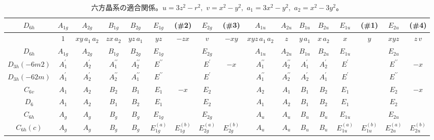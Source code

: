 \documentclass[11pt]{easymemo}
\begin{document}
\begin{landscape}
\begin{table}[ht!]
\scriptsize
\begin{center}
\caption{六方晶系の適合関係。$u=3z^2-r^2,\,\, v=x^2-y^2,\,\, a_1=3x^2-y^2,\,\, a_2=x^2-3y^2$。}
\label{tbl:9}
\renewcommand{\arraystretch}{1.4}
\begin{tabular}{c||c|c|c|c|cc|cc||c|c|c|c|cc|cc} \hline\hline
$ D_{6h} $ & $ A_{1g} $ & $ A_{2g} $ & $ B_{1g} $ & $ B_{2g} $ & $ E_{1g} $ & (\#2) & $ E_{2g} $ & (\#3) & $ A_{1u} $ & $ A_{2u} $ & $ B_{1u} $ & $ B_{2u} $ & $ E_{1u} $ & (\#1) & $ E_{2u} $ & (\#4) \\ \hline\hline
$  $ & $ 1 $ & $ xy\,a_1\,a_2 $ & $ zx\,a_2 $ & $ yz\,a_1 $ & $ yz $ & $ -zx $ & $ v $ & $ -xy $ & $ xyz\,a_1\,a_2 $ & $ z $ & $ y\,a_1 $ & $ x\,a_2 $ & $ x $ & $ y $ & $ xyz $ & $ z\,v $ \\ \hline\hline
$ D_{6h} $ & $ A_{1g} $ & $ A_{2g} $ & $ B_{1g} $ & $ B_{2g} $ & $ E_{1g} $ & & $ E_{2g} $ & & $ A_{1u} $ & $ A_{2u} $ & $ B_{1u} $ & $ B_{2u} $ & $ E_{1u} $ & & $ E_{2u} $ & \\ \hline
$ D_{3h}(-6m2) $ & $ A_{1}^{\prime} $ & $ A_{2}^{\prime} $ & $ A_{1}^{\prime\prime} $ & $ A_{2}^{\prime\prime} $ & $ E^{\prime\prime} $ & & $ E^{\prime} $ & $ -x $ & $ A_{1}^{\prime\prime} $ & $ A_{2}^{\prime\prime} $ & $ A_{1}^{\prime} $ & $ A_{2}^{\prime} $ & $ E^{\prime} $ & & $ E^{\prime\prime} $ & $ -x $ \\ \hline
$ D_{3h}(-62m) $ & $ A_{1}^{\prime} $ & $ A_{2}^{\prime} $ & $ A_{2}^{\prime\prime} $ & $ A_{1}^{\prime\prime} $ & $ E^{\prime\prime} $ & & $ E^{\prime} $ & & $ A_{1}^{\prime\prime} $ & $ A_{2}^{\prime\prime} $ & $ A_{2}^{\prime} $ & $ A_{1}^{\prime} $ & $ E^{\prime} $ & & $ E^{\prime\prime} $ & \\ \hline
$ C_{6v} $ & $ A_{1} $ & $ A_{2} $ & $ B_{2} $ & $ B_{1} $ & $ E_{1} $ & $ -x $ & $ E_{2} $ & & $ A_{2} $ & $ A_{1} $ & $ B_{1} $ & $ B_{2} $ & $ E_{1} $ & & $ E_{2} $ & $ -x $ \\ \hline
$ D_{6} $ & $ A_{1} $ & $ A_{2} $ & $ B_{1} $ & $ B_{2} $ & $ E_{1} $ & & $ E_{2} $ & & $ A_{1} $ & $ A_{2} $ & $ B_{1} $ & $ B_{2} $ & $ E_{1} $ & & $ E_{2} $ \\ \hline
$ C_{6h} $ & $ A_{g} $ & $ A_{g} $ & $ B_{g} $ & $ B_{g} $ & $ E_{1g} $ & & $ E_{2g} $ & & $ A_{u} $ & $ A_{u} $ & $ B_{u} $ & $ B_{u} $ & $ E_{1u} $ & & $ E_{2u} $ & \\ \hline
$ C_{6h}(c) $ & $ A_{g} $ & $ A_{g} $ & $ B_{g} $ & $ B_{g} $ & $ E_{1g}^{(a)} $ & $ E_{1g}^{(b)} $ & $ E_{2g}^{(a)} $ & $ E_{2g}^{(b)} $ & $ A_{u} $ & $ A_{u} $ & $ B_{u} $ & $ B_{u} $ & $ E_{1u}^{(a)} $ & $ E_{1u}^{(b)} $ & $ E_{2u}^{(a)} $ & $ E_{2u}^{(b)} $ \\ \hline

\end{tabular}
\end{center}
\end{table}
\end{landscape}
\end{document}
